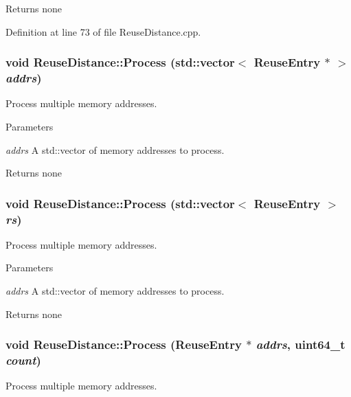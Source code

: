 \begin{DoxyReturn}{Returns}
none 
\end{DoxyReturn}


Definition at line 73 of file ReuseDistance.cpp.

\hypertarget{class_reuse_distance_a88052f5ae1e69bab8fe1f9b7b87c1037}{
\subsubsection[{Process}]{\setlength{\rightskip}{0pt plus 5cm}void ReuseDistance::Process (std::vector$<$ {\bf ReuseEntry} $\ast$ $>$ {\em addrs})}}
\label{class_reuse_distance_a88052f5ae1e69bab8fe1f9b7b87c1037}
Process multiple memory addresses.


\begin{DoxyParams}{Parameters}
\item[{\em addrs}]A std::vector of memory addresses to process.\end{DoxyParams}
\begin{DoxyReturn}{Returns}
none 
\end{DoxyReturn}
\hypertarget{class_reuse_distance_a372960c10d5fb6552c8dfcfd77da38ba}{
\subsubsection[{Process}]{\setlength{\rightskip}{0pt plus 5cm}void ReuseDistance::Process (std::vector$<$ {\bf ReuseEntry} $>$ {\em rs})}}
\label{class_reuse_distance_a372960c10d5fb6552c8dfcfd77da38ba}
Process multiple memory addresses.


\begin{DoxyParams}{Parameters}
\item[{\em addrs}]A std::vector of memory addresses to process.\end{DoxyParams}
\begin{DoxyReturn}{Returns}
none 
\end{DoxyReturn}
\hypertarget{class_reuse_distance_aed9cbdd99de67972a37de4624614de9d}{
\subsubsection[{Process}]{\setlength{\rightskip}{0pt plus 5cm}void ReuseDistance::Process ({\bf ReuseEntry} $\ast$ {\em addrs}, \/  uint64\_\-t {\em count})}}
\label{class_reuse_distance_aed9cbdd99de67972a37de4624614de9d}
Process multiple memory addresses.


